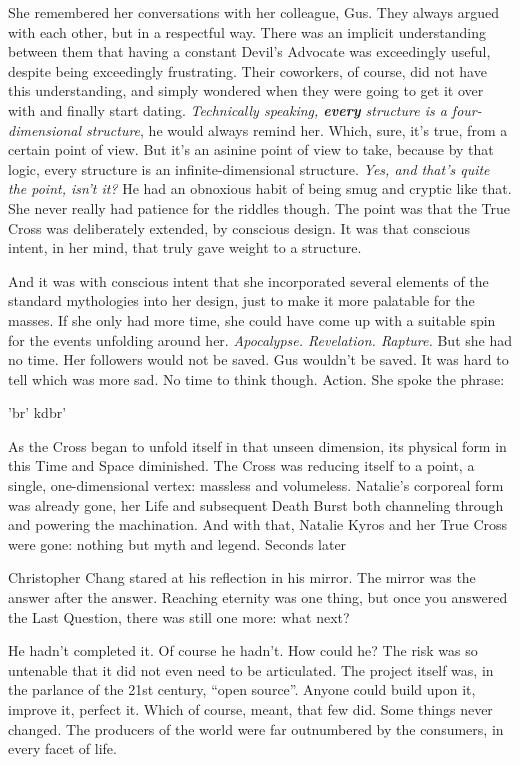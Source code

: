 She remembered her conversations with her colleague, Gus. They always argued with each other, but in a respectful way. There was an implicit understanding between them that having a constant Devil’s Advocate was exceedingly useful, despite being exceedingly frustrating. Their coworkers, of course, did not have this understanding, and simply wondered when they were going to get it over with and finally start dating.
\SmallVSpace
\emph{Technically speaking, \textbf{every} structure is a four-dimensional structure}, he would always remind her. Which, sure, it’s true, from a certain point of view. But it’s an asinine point of view to take, because by that logic, every structure is an infinite-dimensional structure. \emph{Yes, and that’s quite the point, isn’t it?}
\SmallVSpace
He had an obnoxious habit of being smug and cryptic like that. She never really had patience for the riddles though. The point was that the True Cross was deliberately extended, by conscious design. It was that conscious intent, in her mind, that truly gave weight to a structure.

And it was with conscious intent that she incorporated several elements of the standard mythologies into her design, just to make it more palatable for the masses. If she only had more time, she could have come up with a suitable spin for the events unfolding around her. \emph{Apocalypse. Revelation. Rapture.}
\SmallVSpace
But she had no time. Her followers would not be saved. Gus wouldn’t be saved. It was hard to tell which was more sad. No time to think though. Action. She spoke the phrase:
\SmallVSpace
‎‎\begin{cjhebrew}'br' kdbr'\end{cjhebrew}
\SmallVSpace

As the Cross began to unfold itself in that unseen dimension, its physical form in this Time and Space diminished. The Cross was reducing itself to a point, a single, one-dimensional vertex: massless and volumeless. Natalie’s corporeal form was already gone, her Life and subsequent Death Burst both channeling through and powering the machination.
\SomeVSpace
And with that, Natalie Kyros and her True Cross were gone: nothing but myth and legend.
\simpleline
Seconds later

Christopher Chang stared at his reflection in his mirror. The mirror was the answer after the answer. Reaching eternity was one thing, but once you answered the Last Question, there was still one more: what next?

He hadn’t completed it. Of course he hadn’t. How could he? The risk was so untenable that it did not even need to be articulated. The project itself was, in the parlance of the 21st century, “open source”. Anyone could build upon it, improve it, perfect it. Which of course, meant, that few did. Some things never changed. The producers of the world were far outnumbered by the consumers, in every facet of life.

